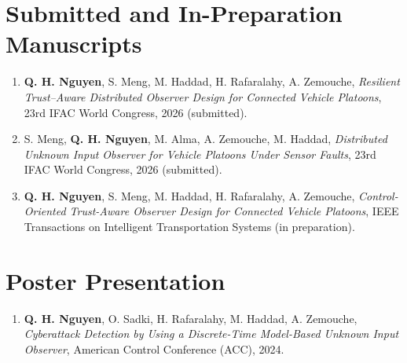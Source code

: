 \documentclass[a4paper,11pt]{article}
\begin{document}
\section*{Submitted and In-Preparation Manuscripts}

\begin{enumerate}
\item \textbf{Q. H. Nguyen}, S. Meng, M. Haddad, H. Rafaralahy, A. Zemouche,  
\emph{Resilient Trust--Aware Distributed Observer Design for Connected Vehicle Platoons},  
23rd IFAC World Congress, 2026 (submitted).

\item S. Meng, \textbf{Q. H. Nguyen}, M. Alma, A. Zemouche, M. Haddad,
\emph{Distributed Unknown Input Observer for Vehicle Platoons Under Sensor Faults},
23rd IFAC World Congress, 2026 (submitted).

\item \textbf{Q. H. Nguyen}, S. Meng, M. Haddad, H. Rafaralahy, A. Zemouche,  
\emph{Control-Oriented Trust-Aware Observer Design for Connected Vehicle Platoons},  
IEEE Transactions on Intelligent Transportation Systems (in preparation).
\end{enumerate}

\section*{Poster Presentation}

\begin{enumerate}
\item \textbf{Q. H. Nguyen}, O. Sadki, H. Rafaralahy, M. Haddad, A. Zemouche,  
\emph{Cyberattack Detection by Using a Discrete-Time Model-Based Unknown Input Observer},  
American Control Conference (ACC), 2024.
\end{enumerate}
\end{document}
